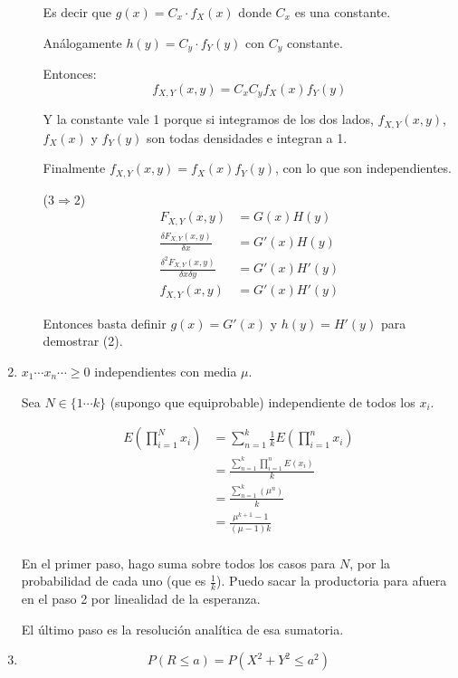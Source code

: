 \begin{enumerate}
\begin{itemize}
				Es decir que $g(x) = C_x\cdot f_X(x)$ donde $C_x$ es una constante.
				
				Análogamente $h(y) = C_y\cdot f_Y(y)$ con $C_y$ constante.
				
				Entonces:
				$$f_{X,Y}(x,y) = C_xC_yf_X(x)f_Y(y)$$
				
				Y la constante vale 1 porque si integramos de los dos lados, $f_{X,Y}(x,y)$, $f_X(x)$ y $f_Y(y)$ son todas densidades e integran a 1.
				
				Finalmente $f_{X,Y}(x,y) = f_X(x)f_Y(y)$, con lo que son independientes.
				
			\item[($3\Rightarrow 2$)]
				\begin{align*}
					F_{X,Y}(x,y)									& = G(x)H(y)	\\
					\frac{\delta F_{X,Y}(x,y)}{\delta x}			& = G'(x)H(y)	\\
					\frac{\delta^2 F_{X,Y}(x,y)}{\delta x \delta y}	& = G'(x)H'(y)	\\
					f_{X,Y}(x,y)									& = G'(x)H'(y)
				\end{align*}
				
				Entonces basta definir $g(x) = G'(x)$ y $h(y) = H'(y)$ para demostrar (2).
		\end{itemize}
		
	\item
		$x_1 \cdots x_n \cdots \geq 0$ independientes con media $\mu$.
		
		Sea $N \in \{1\cdots k\}$ (supongo que equiprobable) independiente de todos los $x_i$.
		
		\begin{align*}
			E(\prod_{i=1}^N x_i)	& = \sum_{n=1}^k \frac{1}{k}E(\prod_{i=1}^n x_i) \\
									& = \frac{\sum_{n=1}^k \prod_{i=1}^n E(x_i)}{k} \\
									& = \frac{\sum_{n=1}^k (\mu ^n)}{k} \\
									& = \frac{\mu^{k+1} - 1}{(\mu - 1)k} \\
		\end{align*}
		
		En el primer paso, hago suma sobre todos los casos para $N$, por la probabilidad de cada uno (que es $\frac{1}{k}$). Puedo sacar la productoria para afuera en el paso 2 por linealidad de la esperanza.
		
		El último paso es la resolución analítica de esa sumatoria.
		
	\item
		$$P(R \leq a) = P(X^2 + Y^2 \leq a^2)$$
		

\end{enumerate}

